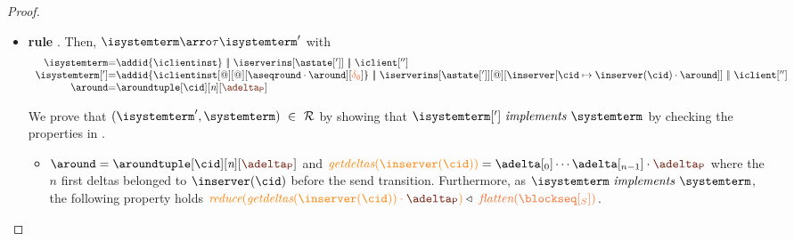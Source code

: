 \begin{proof}
\begin{itemize}
\begin{itemize}
\begin{enumerate}
					\[
					   \mathrulean{\lemref{lemma:reduceinreduce}}
					   {
						  \mathrulean{\lemref{lemma:reduce}}
						  {\ireduce{\igetdeltas{\pending}\cdot{\pushbuffer}} \triangleleft \flatten{\tpending}
						    \quad
						    \transactionbuffer \triangleleft \ttransactionbuffer}
  						{\ireduce{\igetdeltas{\pending}\cdot{\pushbuffer}\cdot \transactionbuffer}\triangleleft \flatten{\tpending\cdot [\ttransactionbuffer]}}  
					   }
					   {\ireduce{\igetdeltas{\pending}\cdot\ireduce{{\pushbuffer}\cdot \transactionbuffer}}\triangleleft \flatten{\tpending\cdot [\ttransactionbuffer]}}  
					\]
					
						
						\item[\ref{prop_size_buffersent}.] It trivially holds since in both cases the counters are incremented by one. 
						\item[{--}] The remaining properties straightforwardly hold.
								
					\end{enumerate}


\item {\bf rule }. Then, $\isystemterm  \arroi{\tau} \isystemterm '$ with 
				\[\begin{array}{r@{=}l}
					\isystemterm & \addid{\iclientinst} \ \bigpar \ \iserverins[\astate[']] \ \bigpar\ \iclient['']\ \\
					\isystemterm['] & \addid{\iclientinst[@][@][\pending \cdot \around][\emptydelta]}
		\ \bigpar \ \iserverins[{\astate[']}][@][\inserver\upd{\cid}{\inserver(\cid)\cdot\around}]
		\ \bigpar\ \iclient[''] \\
					\around & \aroundtuple[\cid][\nround][\pushbuffer]
					\end{array}
				\]
				
											
				We  prove that $(\isystemterm',\systemterm) \ \in \ \mathcal{R}$ by showing that $\implements{\isystemterm[']}{\systemterm}$ 
				by checking the properties in .			

						\begin{itemize}
						
							\item[\ref{prop_sent}.] $\around = \aroundtuple[\cid][\nround][\pushbuffer]$ and $\igetdeltas{\inserver(\cid)} = \adelta[_0] \cdots \adelta[_{n-1}]\cdot\pushbuffer$ where the $n$ first deltas belonged to $\inserver(\cid)$ before the send transition.  Furthermore, as $\implements{\isystemterm}{\systemterm}$, the following property holds $\ireduce{\igetdeltas{\inserver(\cid)}\cdot {\pushbuffer}} \triangleleft \ \flatten{{\tsent}}$.
							

\end{itemize}
\end{itemize}
\end{itemize}
\end{proof}
